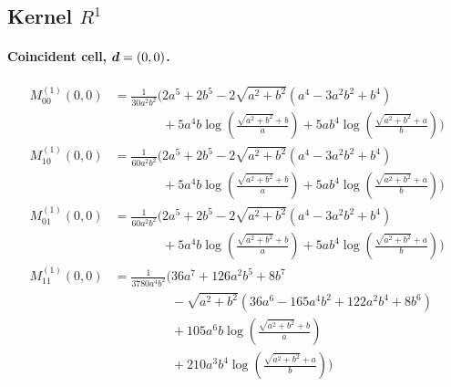 \subsection*{Kernel $R^{1}$}
\paragraph{Coincident cell, $\vb*{d}=(0,0)$.}
\begin{align*}
M^{(1)}_{00}(0,0) &= \frac{1}{30 a^{2} b^{2}}\Bigg(2 a^{5} + 2 b^{5} - 2 \sqrt{a^{2} + b^{2}}\left(a^{4} - 3 a^{2} b^{2} + b^{4}\right)\\
&\phantom{{}=\frac{1}{30 a^{2} b^{2}}\Bigg(}+ 5 a^{4} b \log\left(\frac{\sqrt{a^{2} + b^{2}} + b}{a}\right) + 5 a b^{4} \log\left(\frac{\sqrt{a^{2} + b^{2}} + a}{b}\right)\Bigg)\\[1.2ex]
M^{(1)}_{10}(0,0) &= \frac{1}{60 a^{2} b^{2}}\Bigg(2 a^{5} + 2 b^{5} - 2 \sqrt{a^{2} + b^{2}}\left(a^{4} - 3 a^{2} b^{2} + b^{4}\right)\\
&\phantom{{}=\frac{1}{60 a^{2} b^{2}}\Bigg(}+ 5 a^{4} b \log\left(\frac{\sqrt{a^{2} + b^{2}} + b}{a}\right) + 5 a b^{4} \log\left(\frac{\sqrt{a^{2} + b^{2}} + a}{b}\right)\Bigg)\\[1.2ex]
M^{(1)}_{01}(0,0) &= \frac{1}{60 a^{2} b^{2}}\Bigg(2 a^{5} + 2 b^{5} - 2 \sqrt{a^{2} + b^{2}}\left(a^{4} - 3 a^{2} b^{2} + b^{4}\right)\\
&\phantom{{}=\frac{1}{60 a^{2} b^{2}}\Bigg(}+ 5 a^{4} b \log\left(\frac{\sqrt{a^{2} + b^{2}} + b}{a}\right) + 5 a b^{4} \log\left(\frac{\sqrt{a^{2} + b^{2}} + a}{b}\right)\Bigg)\\[1.2ex]
M^{(1)}_{11}(0,0) &= \frac{1}{3780 a^{4} b^{2}}\Bigg(36 a^{7} + 126 a^{2} b^{5} + 8 b^{7}\\
&\phantom{{}=\frac{1}{3780 a^{4} b^{2}}\Bigg(}- \sqrt{a^{2} + b^{2}}\left(36 a^{6} - 165 a^{4} b^{2} + 122 a^{2} b^{4} + 8 b^{6}\right)\\
&\phantom{{}=\frac{1}{3780 a^{4} b^{2}}\Bigg(}+ 105 a^{6} b \log\left(\frac{\sqrt{a^{2} + b^{2}} + b}{a}\right)\\
&\phantom{{}=\frac{1}{3780 a^{4} b^{2}}\Bigg(}+ 210 a^{3} b^{4} \log\left(\frac{\sqrt{a^{2} + b^{2}} + a}{b}\right)\Bigg)
\end{align*}
